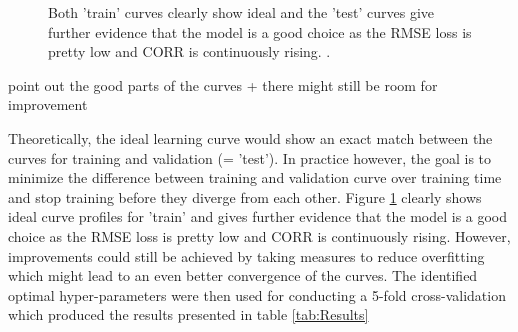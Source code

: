 \begin{figure}[H]
  \centering
  \hfill
  \caption{Both 'train' curves clearly show ideal and the 'test' curves give further evidence that the model is a good choice as the RMSE loss is pretty low and CORR is continuously rising.
.}
  \label{fig:LearningCurveResults}
\end{figure}

point out the good parts of the curves + there might still be room for improvement

Theoretically, the ideal learning curve would show an exact match between the curves for training and validation (= 'test'). In practice however, the goal is to minimize the difference between training and validation curve over training time and stop training before they diverge from each other. 
\newline\newline
Figure \ref{fig:LearningCurveResults} clearly shows ideal curve profiles for 'train' and gives further evidence that the model is a good choice as the RMSE loss is pretty low and CORR is continuously rising. However, improvements could still be achieved by taking measures to reduce overfitting which might lead to an even better convergence of the curves.
\newline\newline
The identified optimal hyper-parameters were then used for conducting a 5-fold cross-validation which produced the results presented in table \ref{tab:Results}

